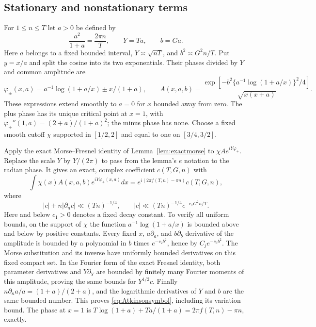 \subsection{Stationary and nonstationary terms}
For $1\le n\le T$ let $a>0$ be defined by
\[
 \frac{a^2}{1+a}=\frac{2\pi n}{T},\qquad Y=Ta,\qquad b=Ga.
\]
Here $a$ belongs to a fixed bounded interval,
$Y\asymp\sqrt{nT}$, and $b^2\asymp G^2n/T$.
Put $y=x/a$ and split the cosine into its two exponentials.
Their phases divided by $Y$ and common amplitude are
\[
 \varphi_\pm(x,a)=a^{-1}\log(1+a/x)\pm x/(1+a),\qquad
 A(x,a,b)=\frac{\exp[-b^2\{a^{-1}\log(1+a/x)\}^2/4]}
                    {\sqrt{x(x+a)}}.
\]
These expressions extend smoothly to $a=0$ for $x$ bounded away
from zero. The plus phase has its unique critical point at $x=1$,
with $\varphi_+''(1,a)=(2+a)/(1+a)^2$; the minus phase has none.
Choose a fixed smooth cutoff $\chi$ supported in $[1/2,2]$ and equal
to one on $[3/4,3/2]$.

Apply the exact Morse--Fresnel identity of Lemma~\ref{lem:exactmorse}
to $\chi A e^{iY\varphi_+}$. Replace the scale $Y$ by $Y/(2\pi)$
to pass from the lemma's $e$ notation to the radian phase. It gives an exact, complex coefficient $c(T,G,n)$ with
\begin{equation}\label{eq:stationaryAtkinson}
 \int\chi(x)A(x,a,b)e^{iY\varphi_+(x,a)}dx
    =e^{i(2\pi f(T,n)-\pi n)}c(T,G,n),
\end{equation}
where
\begin{equation}\label{eq:Atkinsonsymbol}
 |c|+n|\partial_nc|\ll(Tn)^{-1/4},\qquad
 |c|\ll(Tn)^{-1/4}e^{-c_1G^2n/T}.
\end{equation}
Here and below $c_1>0$ denotes a fixed decay constant.
To verify all uniform bounds, on the support of $\chi$ the function
$a^{-1}\log(1+a/x)$ is bounded above and below by positive constants.
Every fixed $x$, $a\partial_a$, and $b\partial_b$ derivative of the
amplitude is bounded by a polynomial in $b$ times $e^{-c_2b^2}$,
hence by $C_j e^{-c_3b^2}$. The Morse substitution and its inverse
have uniformly bounded derivatives on this fixed compact set.
In the Fourier form of the exact Fresnel identity, both parameter
derivatives and $Y\partial_Y$ are bounded by finitely many Fourier
moments of this amplitude, proving the same bounds for $Y^{1/2}c$.
Finally
$n\partial_na/a=(1+a)/(2+a)$, and the logarithmic derivatives of
$Y$ and $b$ are the same bounded number. This proves
\eqref{eq:Atkinsonsymbol}, including its variation bound. The phase
at $x=1$ is
$T\log(1+a)+Ta/(1+a)=2\pi f(T,n)-\pi n$, exactly.

